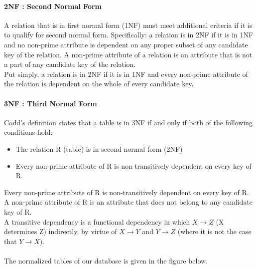 \documentclass[12pt]{report}
\begin{document}
\paragraph*{2NF : Second Normal Form}
A relation that is in first normal form (1NF) must meet additional criteria if it is to qualify for second normal form. Specifically: a relation is in 2NF if it is in 1NF and no non-prime attribute is dependent on any proper subset of any candidate key of the relation. A non-prime attribute of a relation is an attribute that is not a part of any candidate key of the relation. \\
Put simply, a relation is in 2NF if it is in 1NF and every non-prime attribute of the relation is dependent on the whole of every candidate key.

\paragraph*{3NF : Third Normal Form}
Codd's definition states that a table is in 3NF if and only if both of the following conditions hold:-
\begin{itemize}
\item The relation R (table) is in second normal form (2NF)
\item Every non-prime attribute of R is non-transitively dependent on every key of R.
\end{itemize}

\noindent Every non-prime attribute of R is non-transitively dependent on every key of R.
A non-prime attribute of R is an attribute that does not belong to any candidate key of R.\\
 A transitive dependency is a functional dependency in which 
 $ X \rightarrow Z $ (X determines Z) indirectly, by virtue of $X \rightarrow Y$ and $Y \rightarrow Z$ (where it is not the case that $Y \rightarrow X$). \\\\
 \noindent The normalized tables of our database is given in the figure below. \\
 

 
 
\end{document}
